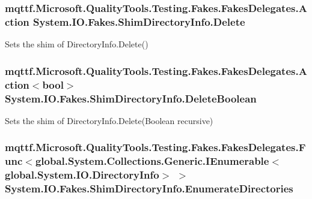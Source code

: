 \hypertarget{class_system_1_1_i_o_1_1_fakes_1_1_shim_directory_info_ab35e587e5ad17a50a42511ae74bff271}{
\subsubsection[{Delete}]{\setlength{\rightskip}{0pt plus 5cm}mqttf.\-Microsoft.\-Quality\-Tools.\-Testing.\-Fakes.\-Fakes\-Delegates.\-Action System.\-I\-O.\-Fakes.\-Shim\-Directory\-Info.\-Delete\hspace{0.3cm}{\ttfamily [set]}}}\label{class_system_1_1_i_o_1_1_fakes_1_1_shim_directory_info_ab35e587e5ad17a50a42511ae74bff271}


Sets the shim of Directory\-Info.\-Delete()

\hypertarget{class_system_1_1_i_o_1_1_fakes_1_1_shim_directory_info_a968c582a05aec8749ecd79cb856ae0b0}{
\subsubsection[{Delete\-Boolean}]{\setlength{\rightskip}{0pt plus 5cm}mqttf.\-Microsoft.\-Quality\-Tools.\-Testing.\-Fakes.\-Fakes\-Delegates.\-Action$<$bool$>$ System.\-I\-O.\-Fakes.\-Shim\-Directory\-Info.\-Delete\-Boolean\hspace{0.3cm}{\ttfamily [set]}}}\label{class_system_1_1_i_o_1_1_fakes_1_1_shim_directory_info_a968c582a05aec8749ecd79cb856ae0b0}


Sets the shim of Directory\-Info.\-Delete(\-Boolean recursive)

\hypertarget{class_system_1_1_i_o_1_1_fakes_1_1_shim_directory_info_af1b3b7df27c901bac249bc6300c21ebc}{
\subsubsection[{Enumerate\-Directories}]{\setlength{\rightskip}{0pt plus 5cm}mqttf.\-Microsoft.\-Quality\-Tools.\-Testing.\-Fakes.\-Fakes\-Delegates.\-Func$<$global.\-System.\-Collections.\-Generic.\-I\-Enumerable$<$global.\-System.\-I\-O.\-Directory\-Info$>$ $>$ System.\-I\-O.\-Fakes.\-Shim\-Directory\-Info.\-Enumerate\-Directories\hspace{0.3cm}{\ttfamily [set]}}}\label{class_system_1_1_i_o_1_1_fakes_1_1_shim_directory_info_af1b3b7df27c901bac249bc6300c21ebc}


